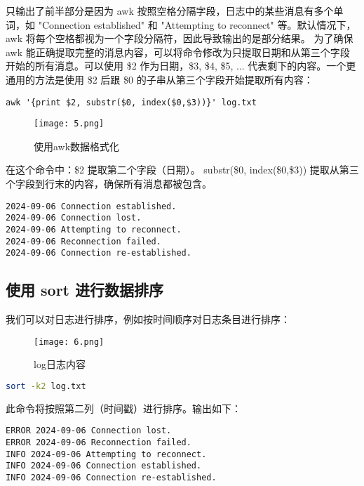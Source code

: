 \documentclass[a4paper, 12pt]{article}
\begin{document}
只输出了前半部分是因为 awk 按照空格分隔字段，日志中的某些消息有多个单词，如 "Connection established" 和 "Attempting to reconnect" 等。默认情况下，awk 将每个空格都视为一个字段分隔符，因此导致输出的是部分结果。
为了确保 awk 能正确提取完整的消息内容，可以将命令修改为只提取日期和从第三个字段开始的所有消息。可以使用 \$2 作为日期，\$3, \$4, \$5, ... 代表剩下的内容。一个更通用的方法是使用 \$2 后跟 \$0 的子串从第三个字段开始提取所有内容：

\begin{lstlisting}
awk '{print $2, substr($0, index($0,$3))}' log.txt
\end{lstlisting}

\begin{figure}[H]
  \centering
    \texttt{[image: 5.png]}
  \caption{使用awk数据格式化}
   \end{figure}
   
   在这个命令中：\$2 提取第二个字段（日期）。
substr(\$0, index(\$0,\$3)) 提取从第三个字段到行末的内容，确保所有消息都被包含。

\begin{lstlisting}
2024-09-06 Connection established.
2024-09-06 Connection lost.
2024-09-06 Attempting to reconnect.
2024-09-06 Reconnection failed.
2024-09-06 Connection re-established.
\end{lstlisting}

\subsection{使用 sort 进行数据排序}
我们可以对日志进行排序，例如按时间顺序对日志条目进行排序：

\begin{figure}[H]
  \centering
    \texttt{[image: 6.png]}
  \caption{log日志内容}
   \end{figure}
   
\begin{lstlisting}[language=bash]
sort -k2 log.txt
\end{lstlisting}

此命令将按照第二列（时间戳）进行排序。输出如下：

\begin{lstlisting}
ERROR 2024-09-06 Connection lost.
ERROR 2024-09-06 Reconnection failed.
INFO 2024-09-06 Attempting to reconnect.
INFO 2024-09-06 Connection established.
INFO 2024-09-06 Connection re-established.
\end{lstlisting}
\end{document}
